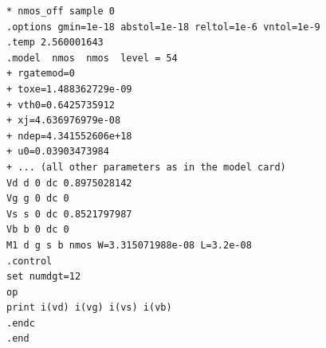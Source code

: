 \begin{verbatim}
* nmos_off sample 0
.options gmin=1e-18 abstol=1e-18 reltol=1e-6 vntol=1e-9
.temp 2.560001643
.model  nmos  nmos  level = 54
+ rgatemod=0
+ toxe=1.488362729e-09
+ vth0=0.6425735912
+ xj=4.636976979e-08
+ ndep=4.341552606e+18
+ u0=0.03903473984
+ ... (all other parameters as in the model card)
Vd d 0 dc 0.8975028142
Vg g 0 dc 0
Vs s 0 dc 0.8521797987
Vb b 0 dc 0
M1 d g s b nmos W=3.315071988e-08 L=3.2e-08
.control
set numdgt=12
op
print i(vd) i(vg) i(vs) i(vb)
.endc
.end
\end{verbatim}
